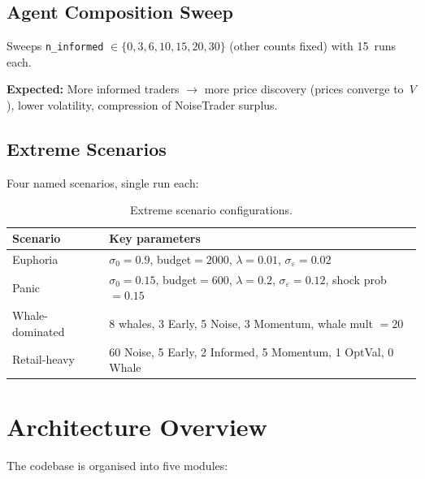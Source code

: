 \documentclass[11pt,a4paper]{article}
\begin{document}
\subsection{Agent Composition Sweep}
\label{sec:exp-composition}

Sweeps \texttt{n\_informed} $\in \{0, 3, 6, 10, 15, 20, 30\}$ (other counts fixed) with 15~runs each.

\textbf{Expected:} More informed traders $\to$ more price discovery (prices converge to~$V$), lower volatility, compression of NoiseTrader surplus.

\subsection{Extreme Scenarios}
\label{sec:exp-extreme}

Four named scenarios, single run each:

\begin{table}[h]
\centering
\caption{Extreme scenario configurations.}
\label{tab:extreme}
\begin{tabular}{@{}lp{10cm}@{}}
\toprule
\textbf{Scenario} & \textbf{Key parameters} \\
\midrule
Euphoria          & $\sigma_0 = 0.9$, budget$= 2000$, $\lambda = 0.01$, $\sigma_\varepsilon = 0.02$ \\
Panic             & $\sigma_0 = 0.15$, budget$= 600$, $\lambda = 0.2$, $\sigma_\varepsilon = 0.12$, shock prob $= 0.15$ \\
Whale-dominated   & 8 whales, 3 Early, 5 Noise, 3 Momentum, whale mult $= 20$ \\
Retail-heavy      & 60 Noise, 5 Early, 2 Informed, 5 Momentum, 1 OptVal, 0 Whale \\
\bottomrule
\end{tabular}
\end{table}


\section{Architecture Overview}
\label{sec:architecture}

The codebase is organised into five modules:
\end{document}

